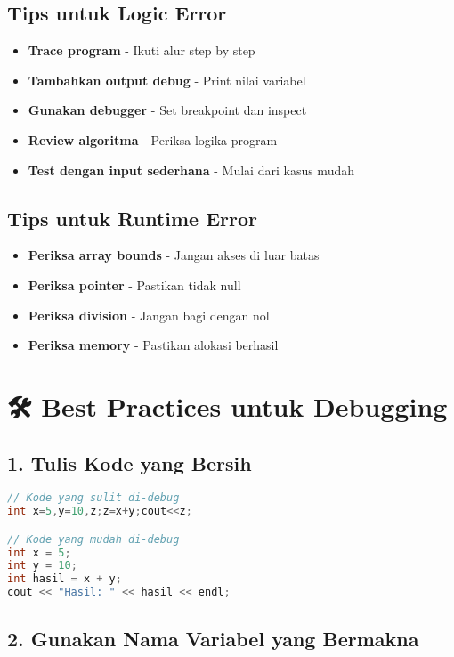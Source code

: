 \subsection{Tips untuk Logic Error}

\begin{itemize}
\item \textbf{Trace program} - Ikuti alur step by step
\item \textbf{Tambahkan output debug} - Print nilai variabel
\item \textbf{Gunakan debugger} - Set breakpoint dan inspect
\item \textbf{Review algoritma} - Periksa logika program
\item \textbf{Test dengan input sederhana} - Mulai dari kasus mudah
\end{itemize}

\subsection{Tips untuk Runtime Error}

\begin{itemize}
\item \textbf{Periksa array bounds} - Jangan akses di luar batas
\item \textbf{Periksa pointer} - Pastikan tidak null
\item \textbf{Periksa division} - Jangan bagi dengan nol
\item \textbf{Periksa memory} - Pastikan alokasi berhasil
\end{itemize}

\section{🛠️ Best Practices untuk Debugging}

\subsection{1. Tulis Kode yang Bersih}

\begin{lstlisting}[language=c++, caption=Kode yang Bersih]
// Kode yang sulit di-debug
int x=5,y=10,z;z=x+y;cout<<z;

// Kode yang mudah di-debug
int x = 5;
int y = 10;
int hasil = x + y;
cout << "Hasil: " << hasil << endl;
\end{lstlisting}

\subsection{2. Gunakan Nama Variabel yang Bermakna}

